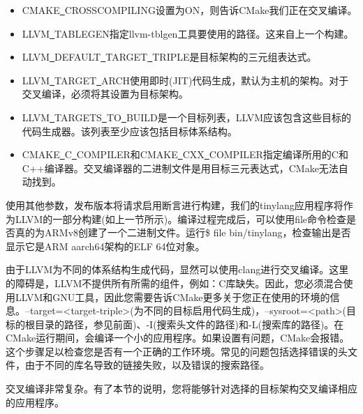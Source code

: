 \begin{itemize}
	\item CMAKE\underline{~}CROSSCOMPILING设置为ON，则告诉CMake我们正在交叉编译。
	\item LLVM\underline{~}TABLEGEN指定llvm-tblgen工具要使用的路径。这来自上一个构建。
	\item LLVM\underline{~}DEFAULT\underline{~}TARGET\underline{~}TRIPLE是目标架构的三元组表达式。
	\item LLVM\underline{~}TARGET\underline{~}ARCH使用即时(JIT)代码生成，默认为主机的架构。对于交叉编译，必须将其设置为目标架构。
	\item LLVM\underline{~}TARGETS\underline{~}TO\underline{~}BUILD是一个目标列表，LLVM应该包含这些目标的代码生成器。该列表至少应该包括目标体系结构。
	\item CMAKE\underline{~}C\underline{~}COMPILER和CMAKE\underline{~}CXX\underline{~}COMPILER指定编译所用的C和C++编译器。交叉编译器的二进制文件是用目标三元表达式，CMake无法自动找到。
\end{itemize}

使用其他参数，发布版本将请求启用断言进行构建，我们的tinylang应用程序将作为LLVM的一部分构建(如上一节所示)。编译过程完成后，可以使用file命令检查是否真的为ARMv8创建了一个二进制文件。运行\$ file bin/tinylang，检查输出是否显示它是ARM aarch64架构的ELF 64位对象。\par

\begin{tcolorbox}[colback=blue!5!white,colframe=blue!75!black, title=使用clang进行交叉编译]
由于LLVM为不同的体系结构生成代码，显然可以使用clang进行交叉编译。这里的障碍是，LLVM不提供所有所需的组件，例如：C库缺失。因此，您必须混合使用LLVM和GNU工具，因此您需要告诉CMake更多关于您正在使用的环境的信息。--target=<target-triple>(为不同的目标启用代码生成)，--sysroot=<path>(目标的根目录的路径，参见前面)、-I(搜索头文件的路径)和-L(搜索库的路径)。在CMake运行期间，会编译一个小的应用程序。如果设置有问题，CMake会报错。这个步骤足以检查您是否有一个正确的工作环境。常见的问题包括选择错误的头文件，由于不同的库名导致的链接失败，以及错误的搜索路径。
\end{tcolorbox}

交叉编译非常复杂。有了本节的说明，您将能够针对选择的目标架构交叉编译相应的应用程序。\par































